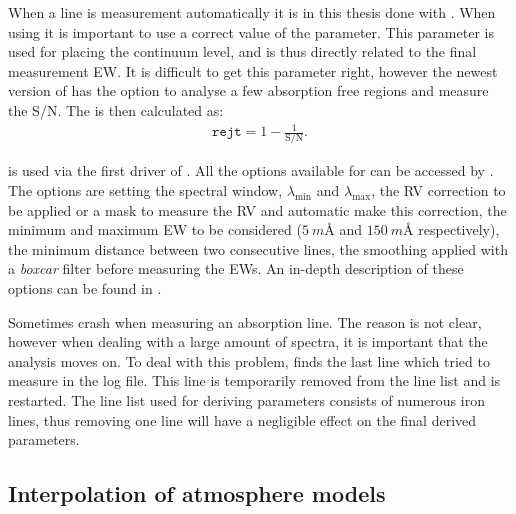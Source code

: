When a line is measurement automatically it is in this thesis done with \ARES
\citep{Sousa2007,Sousa2015a}. When using \ARES it is important to use a correct
value of the  parameter. This parameter is used for placing the
continuum level, and is thus directly related to the final measurement EW. It is
difficult to get this parameter right, however the newest version of \ARES has
the option to analyse a few absorption free regions and measure the S/N. The
 is then calculated as:
\begin{align*}
  \mathtt{rejt} = 1 - \frac{1}{\mathrm{S/N}}.
\end{align*}

\ARES is used via the first driver of \FASMA. All the options available for
\ARES can be accessed by \FASMA. The options are setting the spectral window,
$\lambda_\mathrm{min}$ and $\lambda_\mathrm{max}$, the RV correction to be
applied or a mask to measure the RV and automatic make this correction, the
minimum and maximum EW to be considered ($\SI{5}{m}$\AA{} and $\SI{150}{m}$\AA{}
respectively), the minimum distance between two consecutive lines, the smoothing
applied with a \emph{boxcar} filter before measuring the EWs. An in-depth
description of these options can be found in \citet{Sousa2007,Sousa2015a}.

Sometimes \ARES crash when measuring an absorption line. The reason is not
clear, however when dealing with a large amount of spectra, it is important that
the analysis moves on. To deal with this problem, \FASMA finds the last line
which \ARES tried to measure in the log file. This line is temporarily removed
from the line list and \ARES is restarted. The line list used for deriving
parameters consists of numerous iron lines, thus removing one line will have a
negligible effect on the final derived parameters.



\subsection{Interpolation of atmosphere models}
\label{sec:interpolation}

